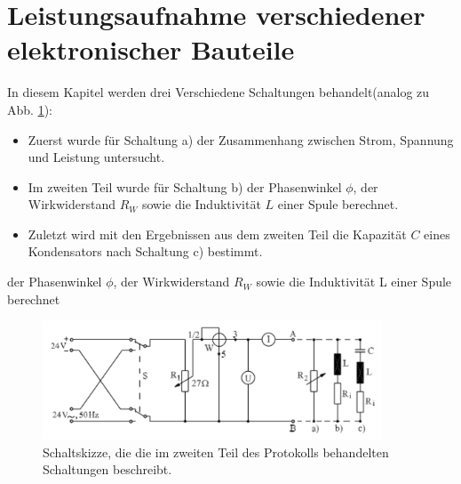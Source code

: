 \section{Leistungsaufnahme verschiedener elektronischer Bauteile}
In diesem Kapitel werden  drei Verschiedene Schaltungen behandelt(analog zu Abb. \ref{fig:Leistungsaufnahme}):
\begin{itemize}
	\item Zuerst wurde für Schaltung a) der Zusammenhang zwischen Strom, Spannung und Leistung untersucht.
	\item Im zweiten Teil wurde für Schaltung b) der Phasenwinkel $\phi$, der Wirkwiderstand $R_W$ sowie die Induktivität $L$ einer Spule	 berechnet.
	\item Zuletzt wird mit den Ergebnissen aus dem zweiten Teil die Kapazität $C$ eines Kondensators nach Schaltung c) bestimmt.
\end{itemize}

der Phasenwinkel $\phi$, der Wirkwiderstand $R_W$ sowie die Induktivität L einer Spule berechnet
\begin{figure}[h]
	\centering
	\includegraphics[width=0.9\textwidth]{res/Schaltskizze.png}
	\caption{Schaltskizze, die die im zweiten Teil des Protokolls behandelten Schaltungen beschreibt.\cite{lw}}
	\label{fig:Leistungsaufnahme}
\end{figure}

